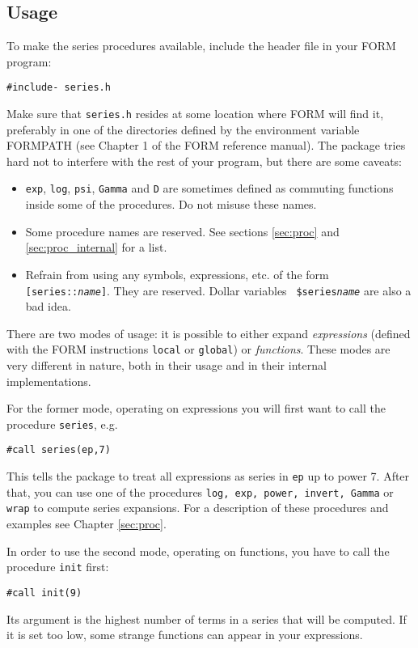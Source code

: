 \documentclass[titlepage]{article}
\begin{document}
\subsection{Usage}
\label{sec:usage}

To make the series procedures available, include the header file in your
FORM program:
\begin{verbatim}
#include- series.h
\end{verbatim}
Make sure that {\tt series.h} resides at some location where FORM will find
it, preferably in one of the directories defined by the environment
variable \mbox{FORMPATH} (see Chapter 1 of the FORM reference manual). The
package tries hard not to interfere with the rest of your program, but
there are some caveats:
\begin{itemize}
\item {\tt exp}, {\tt log}, {\tt psi}, {\tt Gamma} and {\tt D} are
  sometimes defined as commuting functions inside some of the
  procedures. Do not misuse these names.
\item Some procedure names are reserved. See sections \ref{sec:proc} and
  \ref{sec:proc_internal} for a list.
\item Refrain from  using any symbols, expressions, etc. of the form
  {\tt[series::{\it name}]}. They are reserved. Dollar variables {\tt
    \$series{\it name}} are also a bad idea.
\end{itemize}

There are two modes of usage: it is possible to either expand {\em expressions}
(defined with the FORM instructions {\tt local} or {\tt global}) or {\em
  functions}. These modes are very different in nature, both in their
usage and in their internal implementations.

For the former mode, operating on expressions you will first want to
call the procedure {\tt series}, e.g.
\begin{verbatim}
#call series(ep,7)
\end{verbatim}
This tells the package to treat all expressions as series in {\tt ep} up
to power 7. After that, you can use one of the procedures {\tt log, exp,
  power, invert, Gamma} or {\tt wrap} to compute series expansions. For a
description of these procedures and examples see Chapter \ref{sec:proc}.

\medskip

In order to use the second mode, operating on functions, you have to
call the procedure {\tt init} first:
\begin{verbatim}
#call init(9)
\end{verbatim}
Its argument is the highest number of terms in a series that will be
computed. If it is set too low, some strange functions can appear in
your expressions.
\end{document}
